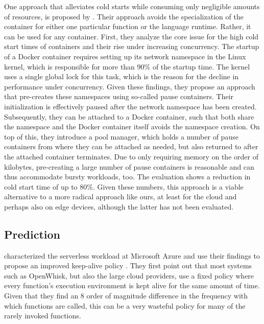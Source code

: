 One approach that alleviates cold starts while consuming only negligible amounts of resources, is proposed by \citeauthor{Mohan2019} \cite{Mohan2019}. Their approach avoids the specialization of the container for either one particular function or the language runtime. Rather, it can be used for any container. First, they analyze the core issue for the high cold start times of containers and their rise under increasing concurrency. The startup of a Docker container requires setting up its network namespace in the Linux kernel, which is responsible for more than 90\% of the startup time. The kernel uses a single global lock for this task, which is the reason for the decline in performance under concurrency. Given these findings, they propose an approach that pre-creates these namespaces using so-called pause containers. Their initialization is effectively paused after the network namespace has been created. Subsequently, they can be attached to a Docker container, such that both share the namespace and the Docker container itself avoids the namespace creation. On top of this, they introduce a pool manager, which holds a number of pause containers from where they can be attached as needed, but also returned to after the attached container terminates. Due to only requiring memory on the order of kilobytes, pre-creating a large number of pause containers is reasonable and can thus accommodate bursty workloads, too. The evaluation shows a reduction in cold start time of up to 80\%. Given these numbers, this approach is a viable alternative to a more radical approach like ours, at least for the cloud and perhaps also on edge devices, although the latter has not been evaluated.



\subsection{Prediction}

\citeauthor{Shahrad2020} characterized the serverless workload at Microsoft Azure and use their findings to propose an improved keep-alive policy \cite{Shahrad2020}. They first point out that most systems such as OpenWhisk, but also the large cloud providers, use a fixed policy where every function's execution environment is kept alive for the same amount of time. Given that they find an 8 order of magnitude difference in the frequency with which functions are called, this can be a very wasteful policy for many of the rarely invoked functions.

